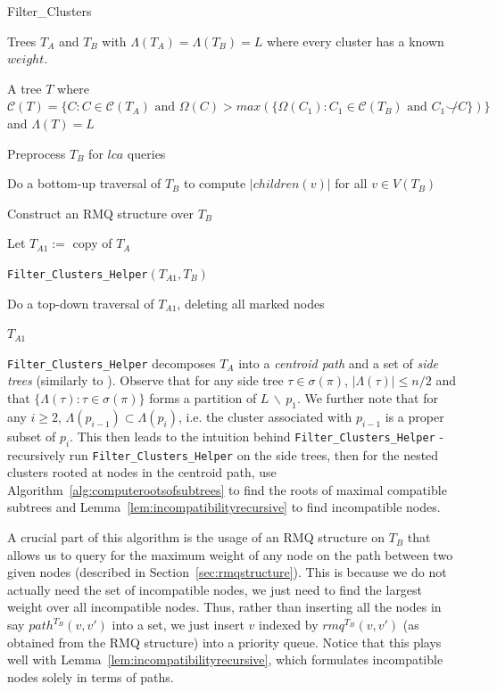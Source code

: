 \documentclass{article}
\newcommand{\compatible}{\smile}
\newcommand{\leafset}{\Lambda}
\begin{document}
    \begin{algorithm}
        \caption{Filter\_Clusters}
        \begin{algorithmic}[1]
            \Input Trees $T_A$ and $T_B$ with $\leafset(T_A) = \leafset(T_B) = L$ where every cluster has a known $weight$.

            \Output A tree $T$ where $\mathcal{C}(T) = \{C : C \in \mathcal{C}(T_A) \text{ and } \Omega(C) > max(\{\Omega(C_1) : C_1 \in \mathcal{C}(T_B) \text{ and } C_1 \not\compatible C\})\}$ and $\leafset(T) = L$

            \State Preprocess $T_B$ for $lca$ queries

            \State Do a bottom-up traversal of $T_B$ to compute $|children(v)|$ for all $v \in V(T_B)$

            \State Construct an RMQ structure over $T_B$

            \State Let $T_{A1} :=$ copy of $T_A$

            \State \texttt{Filter\_Clusters\_Helper}$(T_{A1}, T_B)$

            \State Do a top-down traversal of $T_{A1}$, deleting all marked nodes

            \State \Return $T_{A1}$
        \end{algorithmic}
    \end{algorithm}

    \texttt{Filter\_Clusters\_Helper} decomposes $T_A$ into a \textit{centroid path} and a set of \textit{side trees} (similarly to \cite{jansson2018algorithms}). Observe that for any side tree $\tau \in \sigma(\pi)$, $|\leafset(\tau)| \leq n/2$ and that $\{\leafset(\tau) : \tau \in \sigma(\pi)\}$ forms a partition of $L\, \backslash\, {p_1}$. We further note that for any $i \geq 2$, $\leafset(p_{i - 1}) \subset \leafset(p_i)$, i.e. the cluster associated with $p_{i-1}$ is a proper subset of $p_i$. This then leads to the intuition behind \texttt{Filter\_Clusters\_Helper} - recursively run \texttt{Filter\_Clusters\_Helper} on the side trees, then for the nested clusters rooted at nodes in the centroid path, use Algorithm~\ref{alg:computerootsofsubtrees} to find the roots of maximal compatible subtrees and Lemma~\ref{lem:incompatibilityrecursive} to find incompatible nodes.

    A crucial part of this algorithm is the usage of an RMQ structure on $T_B$ that allows us to query for the maximum weight of any node on the path between two given nodes (described in Section~\ref{sec:rmqstructure}). This is because we do not actually need the set of incompatible nodes, we just need to find the largest weight over all incompatible nodes. Thus, rather than inserting all the nodes in say $path^{T_B}(v, v')$ into a set, we just insert $v$ indexed by $rmq^{T_B}(v, v')$ (as obtained from the RMQ structure) into a priority queue. Notice that this plays well with Lemma~\ref{lem:incompatibilityrecursive}, which formulates incompatible nodes solely in terms of paths.
\end{document}
